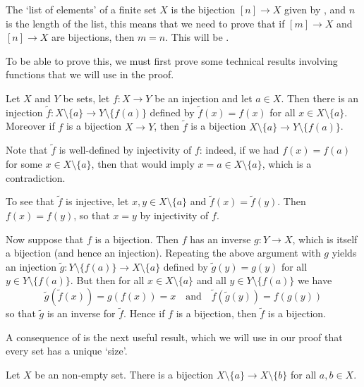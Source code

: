 The `list of elements' of a finite set $X$ is the bijection $[n] \to X$ given by , and $n$ is the length of the list, this means that we need to prove that if $[m] \to X$ and $[n] \to X$ are bijections, then $m=n$. This will be .

To be able to prove this, we must first prove some technical results involving functions that we will use in the proof.

\begin{lemma}
\label{lemRemoveElementFromDomainAndCodomain}
Let $X$ and $Y$ be sets, let $f : X \to Y$ be an injection and let $a \in X$. Then there is an injection $\tilde{f} : X \setminus \{ a \} \to Y \setminus \{ f(a) \}$ defined by $\tilde{f}(x) = f(x)$ for all $x \in X \setminus \{ a \}$. Moreover if $f$ is a bijection $X \to Y$, then $\tilde{f}$ is a bijection $X \setminus \{ a \} \to Y \setminus \{ f(a) \}$.
\end{lemma}

\begin{cproof}
Note that $\tilde{f}$ is well-defined by injectivity of $f$: indeed, if we had $f(x) = f(a)$ for some $x \in X \setminus \{ a \}$, then that would imply $x=a \in X \setminus \{ a \}$, which is a contradiction.

To see that $\tilde{f}$ is injective, let $x,y \in X \setminus \{ a \}$ and $\tilde{f}(x) = \tilde{f}(y)$. Then $f(x) = f(y)$, so that $x=y$ by injectivity of $f$.

Now suppose that $f$ is a bijection. Then $f$ has an inverse $g : Y \to X$, which is itself a bijection (and hence an injection). Repeating the above argument with $g$ yields an injection $\tilde{g} : Y \setminus \{ f(a) \} \to X \setminus \{ a \}$ defined by $\tilde{g}(y) = g(y)$ for all $y \in Y \setminus \{ f(a) \}$. But then for all $x \in X \setminus \{ a \}$ and all $y \in Y \setminus \{ f(a) \}$ we have
\[ \tilde{g}(\tilde{f}(x)) = g(f(x)) = x \quad \text{and} \quad \tilde{f}(\tilde{g}(y)) = f(g(y)) \]
so that $\tilde{g}$ is an inverse for $\tilde{f}$. Hence if $f$ is a bijection, then $\tilde{f}$ is a bijection.
\end{cproof}

A consequence of  is the next useful result, which we will use in our proof that every set has a unique `size'.

\begin{lemma}
\label{lemRemoveElementFromSet}
Let $X$ be an non-empty set. There is a bijection $X \setminus \{ a \} \to X \setminus \{ b \}$ for all $a, b \in X$.
\end{lemma}

